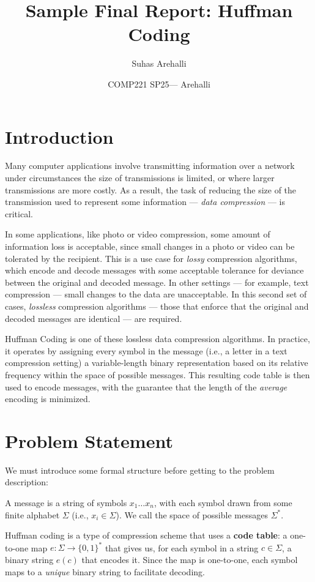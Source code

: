 \documentclass[10pt, twocolumn]{article}
\title{Sample Final Report: Huffman Coding}
\author{Suhas Arehalli}
\date{COMP221 SP25--- Arehalli}
\theoremstyle{prob}
\theoremstyle{definition}
\begin{document}
\maketitle

\section{Introduction}

Many computer applications involve transmitting information over a network under circumstances the size of transmissions is limited, or where larger transmissions are more costly. As a result, the task of reducing the size of the transmission used to represent some information --- \textit{data compression} --- is critical. 

In some applications, like photo or video compression, some amount of information loss is acceptable, since small changes in a photo or video can be tolerated by the recipient. This is a use case for \textit{lossy} compression algorithms, which encode and decode messages with some acceptable tolerance for deviance between the original and decoded message. In other settings --- for example, text compression --- small changes to the data are unacceptable. In this second set of cases, \textit{lossless} compression algorithms --- those that enforce that the original and decoded messages are identical --- are required. 

Huffman Coding is one of these lossless data compression algorithms. In practice, it operates by assigning every symbol in the message (i.e., a letter in a text compression setting) a variable-length binary representation based on its relative frequency within the space of possible messages. This resulting code table is then used to encode messages, with the guarantee that the length of the \textit{average} encoding is minimized. 

\section{Problem Statement}
We must introduce some formal structure before getting to the problem description:

A message is a string of symbols $x_1 \dots x_n$, with each symbol drawn from some finite alphabet $\Sigma$ (i.e., $x_i \in \Sigma$). We call the space of possible messages $\Sigma^*$. 

Huffman coding is a type of compression scheme that uses a \textbf{code table}: a one-to-one map $e: \Sigma \to \{0,1\}^*$ that gives us, for each symbol in a string $c \in \Sigma$, a binary string $e(c)$ that encodes it. Since the map is one-to-one, each symbol maps to a \textit{unique} binary string to facilitate decoding. 
\end{document}
